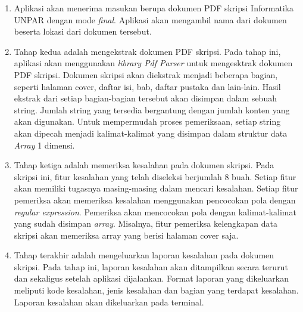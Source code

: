 \begin{enumerate}
	\item Aplikasi akan menerima masukan berupa dokumen PDF skripsi Informatika UNPAR dengan mode \textit{final}. Aplikasi akan mengambil nama dari dokumen beserta lokasi dari dokumen tersebut.
	
	\item Tahap kedua adalah mengekstrak dokumen PDF skripsi. Pada tahap ini, aplikasi akan menggunakan \textit{library Pdf Parser} untuk mengesktrak dokumen PDF skripsi. Dokumen skripsi akan diekstrak menjadi beberapa bagian, seperti halaman cover, daftar isi, bab, daftar pustaka dan lain-lain. Hasil ekstrak dari setiap bagian-bagian tersebut akan disimpan dalam sebuah string. Jumlah string yang tersedia bergantung dengan jumlah konten yang akan digunakan. Untuk mempermudah proses pemeriksaan, setiap string akan dipecah menjadi kalimat-kalimat yang disimpan dalam struktur data \textit{Array} 1 dimensi.
	
	\item Tahap ketiga adalah memeriksa kesalahan pada dokumen skripsi. Pada skripsi ini, fitur kesalahan yang telah diseleksi berjumlah 8 buah. Setiap fitur akan memiliki tugasnya masing-masing dalam mencari kesalahan. Setiap fitur pemeriksa akan memeriksa kesalahan menggunakan pencocokan pola dengan \textit{regular expression}. Pemeriksa akan mencocokan pola dengan kalimat-kalimat yang sudah disimpan \textit{array}. Misalnya, fitur pemeriksa kelengkapan data skripsi akan memeriksa array yang berisi halaman cover saja.
	
	\item Tahap terakhir adalah mengeluarkan laporan kesalahan pada dokumen skripsi. Pada tahap ini, laporan kesalahan akan ditampilkan secara terurut dan sekaligus setelah aplikasi dijalankan. Format laporan yang dikeluarkan meliputi kode kesalahan, jenis kesalahan dan bagian yang terdapat kesalahan. Laporan kesalahan akan dikeluarkan pada terminal.
\end{enumerate}